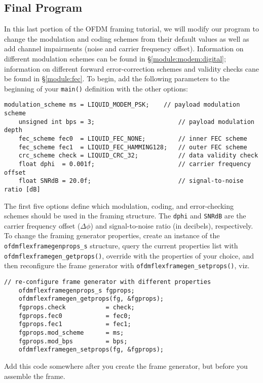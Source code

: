 %
%
\subsection{Final Program}
\label{tutorial:ofdmflexframe:final}

In this last portion of the OFDM framing tutorial, we will modify our
program to change the modulation and coding schemes from their default
values
as well as add channel impairments (noise and carrier frequency offset).
Information on different modulation schemes can be found in
  \S\ref{module:modem:digital};
information on different forward error-correction schemes and validity
checks cane be found in
  \S\ref{module:fec}.
%
To begin, add the following parameters to the beginning of your
{\tt main()} definition with the other options:
%
\begin{Verbatim}[fontsize=\small]
    modulation_scheme ms = LIQUID_MODEM_PSK;    // payload modulation scheme
    unsigned int bps = 3;                       // payload modulation depth
    fec_scheme fec0  = LIQUID_FEC_NONE;         // inner FEC scheme
    fec_scheme fec1  = LIQUID_FEC_HAMMING128;   // outer FEC scheme
    crc_scheme check = LIQUID_CRC_32;           // data validity check
    float dphi  = 0.001f;                       // carrier frequency offset
    float SNRdB = 20.0f;                        // signal-to-noise ratio [dB]
\end{Verbatim}
%
The first five options define which modulation, coding, and
error-checking schemes should be used in the framing structure.
The {\tt dphi} and {\tt SNRdB} are the carrier frequency offset
($\Delta\phi$) and signal-to-noise ratio (in decibels), respectively.
%
To change the framing generator properties, create an instance of the
{\tt ofdmflexframegenprops\_s} structure,
query the current properties list with
{\tt ofdmflexframegen\_getprops()},
override with the properties of your choice,
and then reconfigure the frame generator with
{\tt ofdmflexframegen\_setprops()}, viz.
%
\begin{Verbatim}[fontsize=\small]
    // re-configure frame generator with different properties
    ofdmflexframegenprops_s fgprops;
    ofdmflexframegen_getprops(fg, &fgprops);
    fgprops.check           = check;
    fgprops.fec0            = fec0;
    fgprops.fec1            = fec1;
    fgprops.mod_scheme      = ms;
    fgprops.mod_bps         = bps;
    ofdmflexframegen_setprops(fg, &fgprops);
\end{Verbatim}
%
%
Add this code somewhere after you create the frame generator, but before
you assemble the frame.

